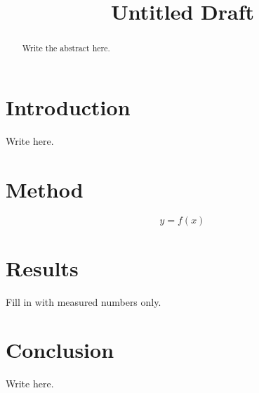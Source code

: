 \documentclass[11pt]{article}
\title{Untitled Draft}
\author{}
\date{}
\begin{document}
\maketitle

\begin{abstract}
Write the abstract here.
\end{abstract}

\section{Introduction}
Write here.

\section{Method}
\begin{equation}
    y = f(x)
\end{equation}

\section{Results}
Fill in with measured numbers only.

\section{Conclusion}
Write here.
\end{document}
